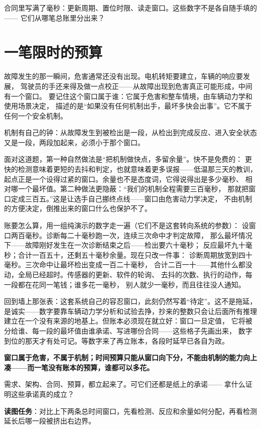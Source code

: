 合同里写满了毫秒：更新周期、置位时限、读走窗口。这些数字不是各自随手填的——
它们从哪笔总账里分出来？

\section{一笔限时的预算}

故障发生的那一瞬间，危害通常还没有出现。电机转矩要建立，车辆的响应要发展，
驾驶员的手还来得及做一点校正——从故障出现到危害真正可能形成，中间有一个窗口。
要记住这个窗口属于谁：它属于危害和整车情境，由车辆动力学和使用场景决定，
描述的是“如果没有任何机制出手，最坏多快会出事”。它不属于任何一个安全机制。

机制有自己的钟：从故障发生到被检出是一段，从检出到完成反应、进入安全状态
又是一段，两段加起来，必须小于那个窗口。

面对这道题，第一种自然做法是“把机制做快点，多留余量”。快不是免费的：
更快的检测意味着更短的去抖和判定，也就意味着更多误报——低温那三天的教训，
起点正是一个设得过紧的窗口。余量也不是态度词，它得说得出是多少毫秒、
相对哪一个最坏值。第二种做法更隐蔽：“我们的机制全程需要三百毫秒，
那就把窗口定成三百五。”这是让选手自己挪终点线——窗口由危害动力学决定，
不由机制的方便决定，倒推出来的窗口什么也保护不了。

账要怎么算，用一组纯演示的数字走一遍（它们不是这套转向系统的参数）：
设窗口两百毫秒。诊断每二十毫秒跑一次，连续三次命中才判定故障，
那么最坏情况下——故障刚好发生在一次诊断结束之后——检出要六十毫秒；
反应最坏九十毫秒；合计一百五十，还剩五十毫秒余量。现在只改一件事：
诊断周期放宽到四十毫秒。三次命中让最坏检出变成一百二十毫秒，
合计二百一十——其他什么都没动，全局已经超时。传感器的更新、软件的轮询、
去抖的次数、执行的动作，每一段都在花同一笔钱；谁多花一毫秒，
别人就少一毫秒，而且往往没人通知。

回到墙上那张表：这套系统自己的容忍窗口，此刻仍然写着“待定”。这不是拖延，
是诚实——数字要靠车辆动力学分析和试验去挣，抄来的整数只会让后面所有推理
建立在一个没有来源的地基上。但账本必须现在就立好：窗口一旦定值，
它将被分给谁、每一段的最坏值由谁承诺、写进哪份合同——这些格子先画出来，
数字到位的那天才有处可记。等数字来了再立账本，各段时延早已各自为政。

\textbf{窗口属于危害，不属于机制；时间预算只能从窗口向下分，不能由机制的能力向上凑——而一笔没有账本的预算，谁都可以多花。}

需求、架构、合同、预算，都立起来了。可它们还都是纸上的承诺——
拿什么证明这些承诺真的成立？


\begin{noteblock}
\textbf{读图任务}：对比上下两条总时间窗口，先看检测、反应和余量如何分配，再看检测延长后哪一段被挤出右边界。
\end{noteblock}

